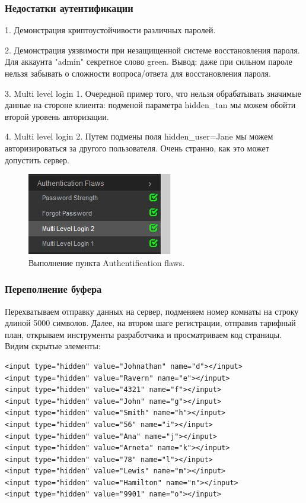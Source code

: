 \documentclass[10pt,a4paper]{article}
\begin{document}
\subsubsection{Недостатки аутентификации}

1. Демонстрация криптоустойчивости различных паролей.

2. Демонстрация уязвимости при незащищенной системе восстановления пароля. Для аккаунта "admin" секретное слово green. Вывод: даже при сильном пароле нельзя забывать о сложности вопроса/ответа для восстановления пароля.

3. Multi level login 1. Очередной пример того, что нельзя обрабатывать значимые данные на стороне клиента: подменой параметра hidden\_tan мы можем обойти второй уровень авторизации.

4. Multi level login 2. Путем подмены поля hidden\_user=Jane мы можем авторизироваться за другого пользователя. Очень странно, как это может допустить сервер.

\begin{figure}[h!]
\centering
\includegraphics[scale=0.6]{3.jpg}
\caption{Выполнение пункта Authentification flaws.}
\end{figure}



\subsubsection{Переполнение буфера}

Перехватываем отправку данных на сервер, подменяем номер комнаты на строку длиной 5000 символов. Далее, на втором шаге регистрации, отправив тарифный план, открываем инструменты разработчика и просматриваем код страницы. Видим скрытые элементы:
\begin{verbatim}
<input type="hidden" value="Johnathan" name="d"></input>
<input type="hidden" value="Ravern" name="e"></input>
<input type="hidden" value="4321" name="f"></input>
<input type="hidden" value="John" name="g"></input>
<input type="hidden" value="Smith" name="h"></input>
<input type="hidden" value="56" name="i"></input>
<input type="hidden" value="Ana" name="j"></input>
<input type="hidden" value="Arneta" name="k"></input>
<input type="hidden" value="78" name="l"></input>
<input type="hidden" value="Lewis" name="m"></input>
<input type="hidden" value="Hamilton" name="n"></input>
<input type="hidden" value="9901" name="o"></input>
\end{verbatim}
 
\end{document}
